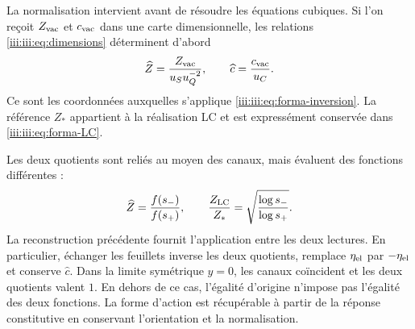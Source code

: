 La normalisation intervient avant de résoudre les équations cubiques.
Si l’on reçoit $Z_{\rm vac}$ et $c_{\rm vac}$ dans une carte dimensionnelle,
les relations \eqref{iii:iii:eq:dimensions} déterminent d’abord
\[
 \widehat Z=\frac{Z_{\rm vac}}{u_Su_Q^{-2}},\qquad
 \widehat c=\frac{c_{\rm vac}}{u_C}.
\]
Ce sont les coordonnées auxquelles s'applique \eqref{iii:iii:eq:forma-inversion}. La référence $Z_*$ appartient à la réalisation LC et est expressément conservée dans \eqref{iii:iii:eq:forma-LC}.

Les deux quotients sont reliés au moyen des canaux, mais évaluent
des fonctions différentes :
\begin{equation}
 \widehat Z=\frac{f(s_-)}{f(s_+)},\qquad
 \frac{Z_{\rm LC}}{Z_*}
       =\sqrt{\frac{\log s_-}{\log s_+}}.
 \label{iii:iii:eq:forma-dos-cocientes}
\end{equation}
La reconstruction précédente fournit l'application entre les deux lectures. En particulier, échanger les feuillets inverse les deux quotients, remplace $\eta_{\rm el}$ par $-\eta_{\rm el}$ et conserve $\widehat c$. Dans la limite symétrique $y=0$, les canaux coïncident et les deux quotients valent $1$. En dehors de ce cas, l'égalité d'origine n'impose pas l'égalité des deux fonctions. La forme d'action est récupérable à partir de la réponse constitutive en conservant l'orientation et la normalisation.
